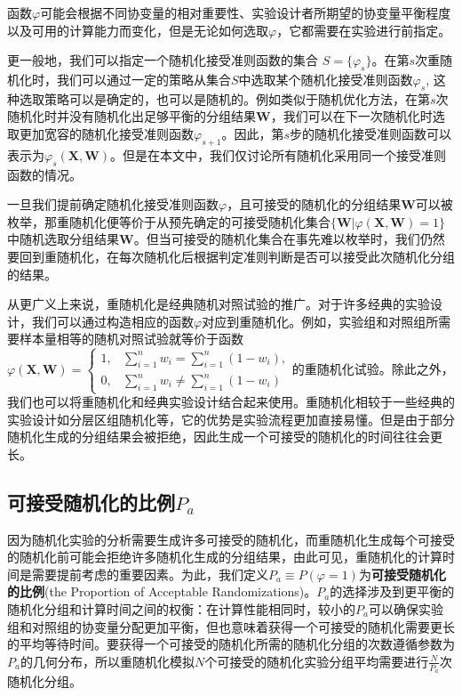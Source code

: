 函数$\varphi$可能会根据不同协变量的相对重要性、实验设计者所期望的协变量平衡程度以及可用的计算能力而变化，但是无论如何选取$\varphi$，它都需要在实验进行前指定。

更一般地，我们可以指定一个随机化接受准则函数的集合 $S = \{\varphi_s\}$。在第$s$次重随机化时，我们可以通过一定的策略从集合$S$中选取某个随机化接受准则函数$\varphi_s$, 这种选取策略可以是确定的，也可以是随机的。例如类似于随机优化方法，在第$s$次随机化时并没有随机化出足够平衡的分组结果$\mathbf{W}$，我们可以在下一次随机化时选取更加宽容的随机化接受准则函数$\varphi_{s+1}$。因此，第$s$步的随机化接受准则函数可以表示为$\varphi_s(\mathbf{X}, \mathbf{W})$。但是在本文中，我们仅讨论所有随机化采用同一个接受准则函数的情况。

一旦我们提前确定随机化接受准则函数$\varphi$，且可接受的随机化的分组结果$\mathbf{W}$可以被枚举，那重随机化便等价于从预先确定的可接受随机化集合$\{\mathbf{W} | \varphi(\mathbf{X},\mathbf{W}) = 1\}$中随机选取分组结果$\mathbf{W}$\cite{kempthorne1955randomization}。但当可接受的随机化集合在事先难以枚举时，我们仍然要回到重随机化，在每次随机化后根据判定准则判断是否可以接受此次随机化分组的结果\cite{moulton2004covariate}。

从更广义上来说，重随机化是经典随机对照试验的推广。对于许多经典的实验设计，我们可以通过构造相应的函数$\varphi$对应到重随机化。例如，实验组和对照组所需要样本量相等的随机对照试验就等价于函数$\varphi(\mathbf{X}, \mathbf{W})= \begin{cases}1, & \sum _{i=1}^n w_i = \sum _{i=1}^n\left(1-w_i\right), \\ 0, & \sum _{i=1}^nw_i \neq \sum _{i=1}^n\left(1-w_i\right)\end{cases}$的重随机化试验。除此之外，我们也可以将重随机化和经典实验设计结合起来使用。重随机化相较于一些经典的实验设计如分层区组随机化等，它的优势是实验流程更加直接易懂。但是由于部分随机化生成的分组结果会被拒绝，因此生成一个可接受的随机化的时间往往会更长。

\subsection{可接受随机化的比例$P_a$}

因为随机化实验的分析需要生成许多可接受的随机化，而重随机化生成每个可接受的随机化前可能会拒绝许多随机化生成的分组结果，由此可见，重随机化的计算时间是需要提前考虑的重要因素。为此，我们定义$P_a \equiv P(\varphi = 1)$为\textbf{可接受随机化的比例}(the Proportion of Acceptable Randomizations)。$P_a$的选择涉及到更平衡的随机化分组和计算时间之间的权衡：在计算性能相同时，较小的$P_a$可以确保实验组和对照组的协变量分配更加平衡，但也意味着获得一个可接受的随机化需要更长的平均等待时间。要获得一个可接受的随机化所需的随机化分组的次数遵循参数为$P_a$的几何分布，所以重随机化模拟$N$个可接受的随机化实验分组平均需要进行$\frac{N}{P_a}$次随机化分组。

